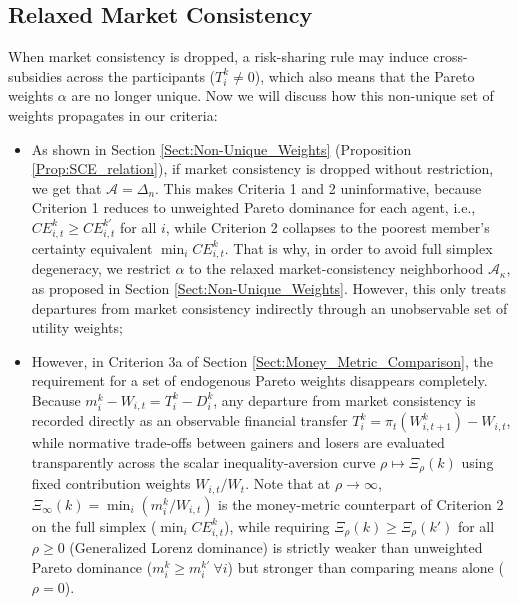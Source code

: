 \subsection{Relaxed Market Consistency}
When market consistency is dropped, a risk-sharing rule may induce cross-subsidies across the participants ($T_i^k \neq 0$), which also means that the Pareto weights $\alpha$ are no longer unique. Now we will discuss how this non-unique set of weights propagates in our criteria:
\begin{itemize}
    \item As shown in Section \ref{Sect:Non-Unique_Weights} (Proposition \ref{Prop:SCE_relation}), if market consistency is dropped without restriction, we get that $\mathcal{A} = \Delta_n$. This makes Criteria 1 and 2 uninformative, because Criterion 1 reduces to unweighted Pareto dominance for each agent, i.e., $CE_{i,t}^k \geq CE_{i,t}^{k'}$ for all $i$, while Criterion 2 collapses to the poorest member's certainty equivalent $\min_i CE_{i,t}^k$. That is why, in order to avoid full simplex degeneracy, we restrict $\alpha$ to the relaxed market-consistency neighborhood $\mathcal{A}_{\kappa}$, as proposed in Section \ref{Sect:Non-Unique_Weights}. However, this only treats departures from market consistency indirectly through an unobservable set of utility weights;
    \item However, in Criterion 3a of Section \ref{Sect:Money_Metric_Comparison}, the requirement for a set of endogenous Pareto weights disappears completely. Because $m_i^k - W_{i,t} = T_i^k - D_i^k$, any departure from market consistency is recorded directly as an observable financial transfer $T_i^k = \pi_t(W_{i,t+1}^k) - W_{i,t}$, while normative trade-offs between gainers and losers are evaluated transparently across the scalar inequality-aversion curve $\rho \mapsto \Xi_\rho(k)$ using fixed contribution weights $W_{i,t}/W_t$. Note that at $\rho \to \infty$, $\Xi_\infty(k) = \min_i (m_i^k / W_{i,t})$ is the money-metric counterpart of Criterion 2 on the full simplex ($\min_i CE_{i,t}^k$), while requiring $\Xi_\rho(k) \geq \Xi_\rho(k')$ for all $\rho \geq 0$ (Generalized Lorenz dominance) is strictly weaker than unweighted Pareto dominance ($m_i^k \geq m_i^{k'} \ \forall i$) but stronger than comparing means alone ($\rho = 0$).
\end{itemize}

